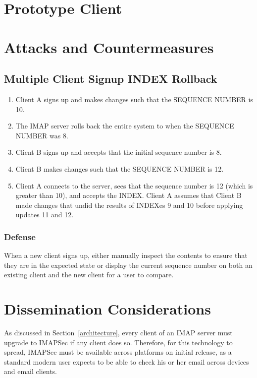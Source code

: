 \documentclass[pageno]{jpaper}
\newcommand{\project}{IMAPSec }
\begin{document}
\section{Prototype Client}



\section{Attacks and Countermeasures}
\subsection{Multiple Client Signup INDEX Rollback}
\begin{enumerate}
\item Client A signs up and makes changes such that the SEQUENCE NUMBER is 10.
\item The IMAP server rolls back the entire system to when the SEQUENCE NUMBER was 8.
\item Client B signs up and accepts that the initial sequence number is 8.
\item Client B makes changes such that the SEQUENCE NUMBER is 12.
\item Client A connects to the server, sees that the sequence number is 12 (which is greater than 10), and accepts the INDEX. Client A assumes that Client B made changes that undid the results of INDEXes 9 and 10 before applying updates 11 and 12.
\end{enumerate}

\subsubsection{Defense}
When a new client signs up, either manually inspect the contents to ensure that they are in the expected state or display the current sequence number on both an existing client and the new client for a user to compare.

\section{Dissemination Considerations}
As discussed in Section~\ref{architecture}, every client of an IMAP server must upgrade to \project if any client does so. Therefore, for this technology to spread, \project must be available across platforms on initial release, as a standard modern user expects to be able to check his or her email across devices and email clients. 
\end{document}
